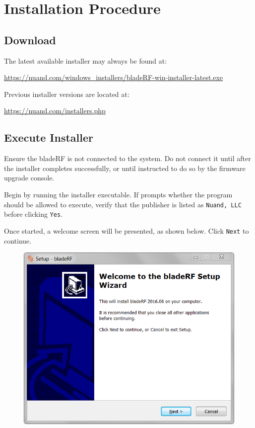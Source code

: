 \newpage

\section{Installation Procedure}

\subsection{Download}

The latest available installer may always be found at:

{\centerline{\footnotesize{\url{https://nuand.com/windows\_installers/bladeRF-win-installer-latest.exe}}}

Previous installer versions are located at:

\centerline{\footnotesize{\url{https://nuand.com/installers.php}}}

\subsection{Execute Installer}

Ensure the bladeRF is not connected to the system. Do not connect it until
after the installer completes successfully, or until instructed to do so by
the firmware upgrade console.

Begin by running the installer executable. If \windows prompts whether the
program should be allowed to execute, verify that the publisher is listed as
\texttt{Nuand, LLC} before clicking \texttt{Yes}.

Once started, a welcome screen will be presented, as shown below. Click \texttt{Next} to continue.

\begin{figure}[h]
  \centering
  \includegraphics{images/windows/installer/01-welcome.png}
\end{figure}

}
